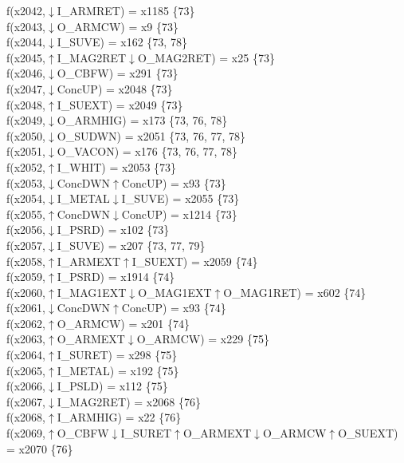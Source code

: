 f(x2042,$\downarrow$I\_ARMRET) = x1185 \{73\} \\  
f(x2043,$\downarrow$O\_ARMCW) = x9 \{73\} \\  
f(x2044,$\downarrow$I\_SUVE) = x162 \{73, 78\} \\  
f(x2045,$\uparrow$I\_MAG2RET$\downarrow$O\_MAG2RET) = x25 \{73\} \\  
f(x2046,$\downarrow$O\_CBFW) = x291 \{73\} \\  
f(x2047,$\downarrow$ConcUP) = x2048 \{73\} \\  
f(x2048,$\uparrow$I\_SUEXT) = x2049 \{73\} \\  
f(x2049,$\downarrow$O\_ARMHIG) = x173 \{73, 76, 78\} \\  
f(x2050,$\downarrow$O\_SUDWN) = x2051 \{73, 76, 77, 78\} \\  
f(x2051,$\downarrow$O\_VACON) = x176 \{73, 76, 77, 78\} \\  
f(x2052,$\uparrow$I\_WHIT) = x2053 \{73\} \\  
f(x2053,$\downarrow$ConcDWN$\uparrow$ConcUP) = x93 \{73\} \\  
f(x2054,$\downarrow$I\_METAL$\downarrow$I\_SUVE) = x2055 \{73\} \\  
f(x2055,$\uparrow$ConcDWN$\downarrow$ConcUP) = x1214 \{73\} \\  
f(x2056,$\downarrow$I\_PSRD) = x102 \{73\} \\  
f(x2057,$\downarrow$I\_SUVE) = x207 \{73, 77, 79\} \\  
f(x2058,$\uparrow$I\_ARMEXT$\uparrow$I\_SUEXT) = x2059 \{74\} \\  
f(x2059,$\uparrow$I\_PSRD) = x1914 \{74\} \\  
f(x2060,$\uparrow$I\_MAG1EXT$\downarrow$O\_MAG1EXT$\uparrow$O\_MAG1RET) = x602 \{74\} \\  
f(x2061,$\downarrow$ConcDWN$\uparrow$ConcUP) = x93 \{74\} \\  
f(x2062,$\uparrow$O\_ARMCW) = x201 \{74\} \\  
f(x2063,$\uparrow$O\_ARMEXT$\downarrow$O\_ARMCW) = x229 \{75\} \\  
f(x2064,$\uparrow$I\_SURET) = x298 \{75\} \\  
f(x2065,$\uparrow$I\_METAL) = x192 \{75\} \\  
f(x2066,$\downarrow$I\_PSLD) = x112 \{75\} \\  
f(x2067,$\downarrow$I\_MAG2RET) = x2068 \{76\} \\  
f(x2068,$\uparrow$I\_ARMHIG) = x22 \{76\} \\  
f(x2069,$\uparrow$O\_CBFW$\downarrow$I\_SURET$\uparrow$O\_ARMEXT$\downarrow$O\_ARMCW$\uparrow$O\_SUEXT) = x2070 \{76\} \\  
